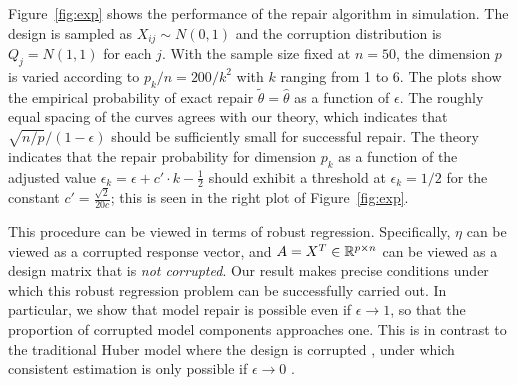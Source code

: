 Figure~\ref{fig:exp} shows the performance of
the repair algorithm in simulation. The design is sampled as $X_{ij} \sim N(0,1)$ and the corruption distribution is $Q_j = N(1,1)$ for each $j$. With the sample size fixed at $n=50$, the dimension $p$ is varied according to $p_k/n=200/k^2$ with
$k$ ranging from 1 to 6. The plots show the empirical probability of exact repair $\tilde\theta = \hat\theta$ as a function of $\epsilon$. The roughly equal spacing of the curves agrees with our theory, which indicates that $\sqrt{n/p}/(1-\epsilon)$ should be sufficiently small for successful repair. The theory indicates that the repair probability for dimension $p_k$ as a function of the adjusted value $\epsilon_k = \epsilon + c'\cdot k - \frac{1}{2}$ should exhibit a threshold at
$\epsilon_k = 1/2$ for the constant $c' = \frac{\sqrt{2}}{20 c}$; this is seen in the right plot of Figure~\ref{fig:exp}.



 This procedure can be viewed in terms of robust regression. Specifically, $\eta$ can be viewed as a corrupted response vector, and $A = X^T \in \mathbb{R}^{p\times n}$ can be viewed as a design matrix that is \textit{not corrupted}.  Our result makes precise conditions under which this robust regression problem can be successfully carried out.
In particular, we show that model repair is possible even if $\epsilon \to 1$, so that the proportion of corrupted model components approaches one. This is in contrast to the traditional Huber model where the design is corrupted \citep{huber:64}, under which consistent estimation is only possible if $\epsilon \to 0$ \citep{chen2016,gao2020}.

